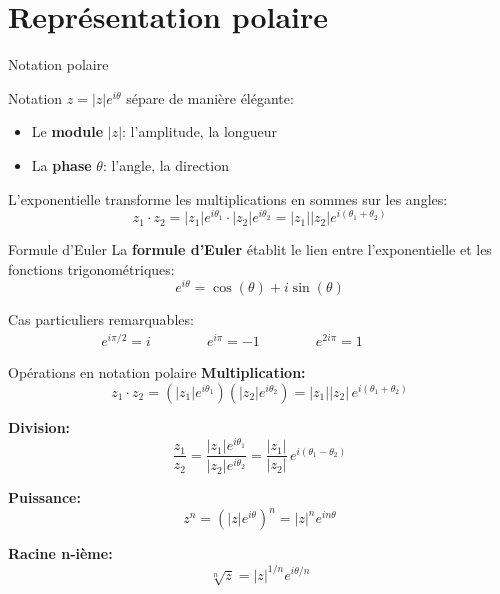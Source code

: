 \documentclass[aspectratio=169,12pt]{beamer}
\begin{document}
\section{Représentation polaire}

\begin{frame}{Notation polaire}

  \bigskip
  Notation $z = |z| e^{i\theta}$ sépare de manière élégante:

  \bigskip
  \begin{itemize}
    \setlength{\itemsep}{1em}
    \item Le \textbf{module} $|z|$: l'amplitude, la longueur
    \item La \textbf{phase} $\theta$: l'angle, la direction
  \end{itemize}

  \begin{flushright}
    \vspace{-35mm}
  \end{flushright}

  L'exponentielle transforme les multiplications en sommes sur les angles:
  \[
    z_1 \cdot z_2 = |z_1| e^{i\theta_1} \cdot |z_2| e^{i\theta_2} = |z_1||z_2| e^{i(\theta_1 + \theta_2)}
  \]

\end{frame}

\begin{frame}{Formule d'Euler}
  La \textbf{formule d'Euler} établit le lien entre l'exponentielle et les fonctions trigonométriques:
  \[
    e^{i\theta} = \cos(\theta) + i\sin(\theta)
  \]
  
  \bigskip
  Cas particuliers remarquables:
  \begin{align*}
    e^{i\pi/2} = i \qquad\qquad
    e^{i\pi} = -1 \qquad\qquad
    e^{2i\pi} = 1 \qquad\qquad
  \end{align*}
\end{frame}

\begin{frame}{Opérations en notation polaire}
  \textbf{Multiplication:}
  \[
    z_1 \cdot z_2 = (|z_1| e^{i\theta_1})(|z_2| e^{i\theta_2}) = |z_1||z_2| \, e^{i(\theta_1+\theta_2)}
  \]
  
  \textbf{Division:}
  \[
    \frac{z_1}{z_2} = \frac{|z_1| e^{i\theta_1}}{|z_2| e^{i\theta_2}} = \frac{|z_1|}{|z_2|} \, e^{i(\theta_1-\theta_2)}
  \]
  
  \textbf{Puissance:}
  \[
    z^n = (|z| e^{i\theta})^n = |z|^n e^{in\theta}
  \]
  
  \textbf{Racine n-ième:}
  \[
    \sqrt[n]{z} = |z|^{1/n} e^{i\theta/n}
  \]
\end{frame}
\end{document}
